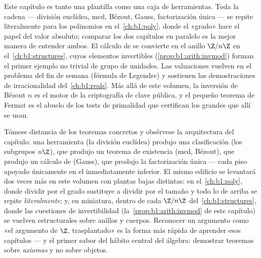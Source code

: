 \begin{remark}\label{rem:b1:arith:whereused}
Este capítulo es tanto una plantilla como una caja de herramientas.
Toda la cadena --- división euclídea, mcd, Bézout, Gauss,
factorización única --- se repite literalmente para los polinomios en
el~\cref{ch:b1:poly}, donde el «grado» hace el papel del valor
absoluto; comparar los dos capítulos en paralelo es la mejor manera de
entender ambos. El cálculo de  se convierte en el anillo
$\Z/n\Z$ en el~\cref{ch:b1:structures}, cuyos elementos invertibles
(\cref{prop:b1:arith:invmod}) forman el primer ejemplo no trivial de
grupo de unidades. Las valuaciones vuelven en el problema del fin de
semana (fórmula de Legendre) y sostienen las demostraciones de
irracionalidad del~\cref{ch:b1:reals}. Más allá de este volumen, la
inversión de Bézout  $n$ es el motor de la criptografía de clave
pública, y el pequeño teorema de Fermat es el abuelo de los tests de
primalidad que certifican los grandes  que allí se usan.
\end{remark}

\begin{remark}\label{rem:b1:arith:interlude}
Tómese distancia de los teoremas concretos y obsérvese la arquitectura
del capítulo: una herramienta (la división euclídea) produjo una
clasificación (los subgrupos $n\Z$), que produjo un teorema de
existencia (mcd, Bézout), que produjo un cálculo de
 (Gauss), que produjo la factorización única --- cada
piso apoyado únicamente en el inmediatamente inferior. El mismo
edificio se levantará dos veces más en este volumen con plantas bajas
distintas: en el~\cref{ch:b1:poly}, donde dividir por el grado
sustituye a dividir por el tamaño y todo lo de arriba se repite
\emph{literalmente}; y, en miniatura, dentro de cada $\Z/n\Z$
del~\cref{ch:b1:structures}, donde las cuestiones de invertibilidad
(la~\cref{prop:b1:arith:invmod} de este capítulo) se vuelven
 estructurales sobre anillos y cuerpos. Reconocer un
argumento como «el argumento de $\Z$, trasplantado» es la forma más
rápida de aprender esos capítulos --- y el primer sabor del hábito
central del álgebra: demostrar teoremas sobre \emph{axiomas} y no sobre
objetos.
\end{remark}

